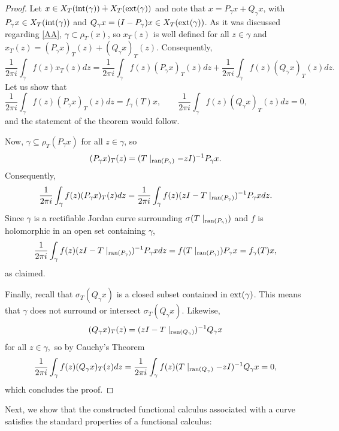 \documentclass[11pt]{amsart}
\theoremstyle{definition}
\theoremstyle{remark}
\numberwithin{equation}{section}
\newcommand{\ran}{\textnormal{ran}}
\newcommand{\inte}{\textnormal{int}}
\newcommand{\exte}{\textnormal{ext}}
\begin{document}
\smallskip

	\begin{proof}
Let $x\in X_T(\inte(\gamma))\dotplus X_T(\exte(\gamma))$ and note that $x= P_\gamma x + Q_\gamma x$, with $P_\gamma x\in X_T(\inte(\gamma))$ and $Q_\gamma x = (I-P_\gamma)x \in X_T(\exte(\gamma))$. As it was discussed regarding \eqref{AA}, $\gamma\subset \rho_T(x)$, so $x_T(z)$ is well defined for all $z\in \gamma$ and $x_T(z) = (P_\gamma x)_T(z) + (Q_\gamma x)_T(z)$. Consequently,
        $$
         \frac{1}{2\pi i}\int_\gamma f(z) x_T(z)dz= \frac{1}{2\pi i} \int_\gamma f(z) (P_\gamma x)_T(z) dz + \frac{1}{2\pi i} \int_\gamma f(z) (Q_\gamma x)_T(z) dz.
        $$
Let us show that
    $$
    \frac{1}{2\pi i} \int_\gamma f(z) (P_\gamma x)_T(z) dz = f_\gamma(T)x, \qquad \frac{1}{2\pi i} \int_\gamma f(z) (Q_\gamma x)_T(z) dz =0,
    $$
    and the statement of the theorem would follow.

Now, $\gamma \subseteq  \rho_T(P_\gamma x)$  for all $z\in \gamma$, so
$$(P_\gamma x)_T(z) = (T\mid_{\ran(P_\gamma)}-zI)^{-1}P_\gamma x.$$
Consequently,
		\begin{equation*}
			\begin{split}
				\frac{1}{2\pi i}\int_\gamma f(z) (P_\gamma x)_T(z) dz = \frac{1}{2\pi i} \int_\gamma f(z) (zI-T\mid_{\ran(P_\gamma)})^{-1}P_\gamma x dz.
			\end{split}
		\end{equation*}
Since $\gamma$ is a rectifiable Jordan curve surrounding $\sigma(T\mid_{\ran(P_\gamma)})$ and $f$ is holomorphic in an open set containing $\gamma$,
$$\frac{1}{2\pi i} \int_\gamma f(z) (zI-T\mid_{\ran(P_\gamma)})^{-1}P_\gamma x dz = f(T\mid_{\ran(P_\gamma)}) P_\gamma x = f_\gamma(T)x,$$
as claimed.

\smallskip

		
Finally,  recall that $\sigma_T(Q_\gamma x)$ is a closed subset contained in $\exte(\gamma)$. This means that $\gamma$ does not surround or intersect $\sigma_T(Q_\gamma x)$. Likewise,
$$(Q_\gamma x)_T(z) = (zI-T\mid_{\ran(Q_\gamma)})^{-1}Q_\gamma x$$
for all $z\in \gamma,$ so by Cauchy's Theorem
$$\frac{1}{2\pi i} \int_\gamma f(z)(Q_\gamma x)_T(z)dz = \frac{1}{2\pi i}\int_\gamma f(z) (T\mid_{\ran(Q_\gamma)}-zI)^{-1}Q_\gamma x = 0, $$
which concludes the proof.
\end{proof}

\smallskip


Next, we show that the constructed functional calculus associated with a curve satisfies the standard properties of a functional calculus:
\end{document}
